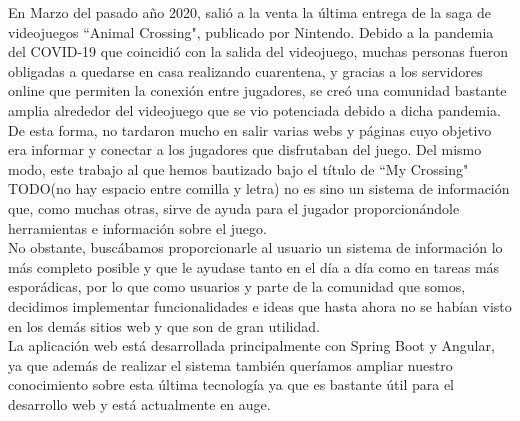 
En Marzo del pasado año 2020, salió a la venta la última entrega de la saga de videojuegos ``Animal Crossing", publicado por Nintendo. Debido a la pandemia del COVID-19 que coincidió con la salida del videojuego, muchas personas fueron obligadas a quedarse en casa realizando cuarentena, y gracias a los servidores online que permiten la conexión entre jugadores, se creó una comunidad bastante amplia alrededor del videojuego que se vio potenciada debido a dicha pandemia.\\

De esta forma, no tardaron mucho en salir varias webs y páginas cuyo objetivo era informar y conectar a los jugadores que disfrutaban del juego. Del mismo modo, este trabajo al que hemos bautizado bajo el título de ``My Crossing" TODO(no hay espacio entre comilla y letra) no es sino un sistema de información que, como muchas otras, sirve de ayuda para el jugador proporcionándole herramientas e información sobre el juego.\\

No obstante, buscábamos proporcionarle al usuario un sistema de información lo más completo posible y que le ayudase tanto en el día a día como en tareas más esporádicas, por lo que como usuarios y parte de la comunidad que somos, decidimos implementar funcionalidades e ideas que hasta ahora no se habían visto en los demás sitios web y que son de gran utilidad.\\

La aplicación web está desarrollada principalmente con Spring Boot y Angular, ya que además de realizar el sistema también queríamos ampliar nuestro conocimiento sobre esta última tecnología ya que es bastante útil para el desarrollo web y está actualmente en auge.

